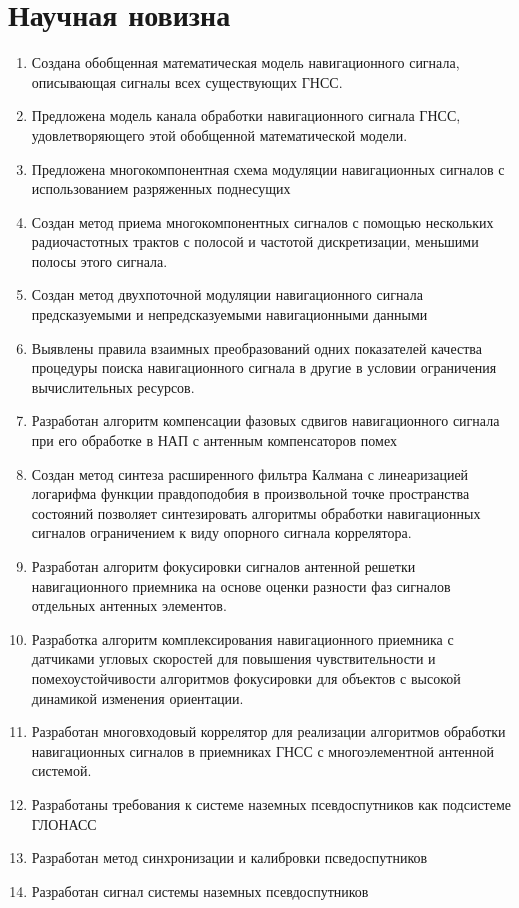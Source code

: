 \section*{Научная новизна}

\begin{enumerate}
\item Создана обобщенная математическая модель навигационного сигнала, описывающая сигналы всех существующих ГНСС.
\item Предложена модель канала обработки навигационного сигнала ГНСС, удовлетворяющего этой обобщенной математической модели.
\item Предложена многокомпонентная схема модуляции навигационных сигналов с использованием разряженных поднесущих
\item Создан метод приема многокомпонентных сигналов с помощью нескольких радиочастотных трактов с полосой и частотой дискретизации, меньшими полосы этого сигнала.
\item Создан метод двухпоточной модуляции навигационного сигнала предсказуемыми и непредсказуемыми навигационными данными
\item Выявлены правила взаимных преобразований одних показателей качества процедуры поиска навигационного сигнала в другие в условии ограничения вычислительных ресурсов.
\item Разработан алгоритм компенсации фазовых сдвигов навигационного сигнала при его обработке в НАП с антенным компенсаторов помех
\item Создан метод синтеза расширенного фильтра Калмана с линеаризацией логарифма функции правдоподобия в произвольной точке пространства состояний позволяет синтезировать алгоритмы обработки навигационных сигналов ограничением к виду опорного сигнала коррелятора.
\item Разработан алгоритм фокусировки сигналов антенной решетки навигационного приемника на основе оценки разности фаз сигналов отдельных антенных элементов.
\item Разработка алгоритм комплексирования навигационного приемника с датчиками угловых скоростей для повышения чувствительности и помехоустойчивости алгоритмов фокусировки для объектов с высокой динамикой изменения ориентации. 
\item Разработан многовходовый коррелятор для реализации алгоритмов обработки навигационных сигналов в приемниках ГНСС с многоэлементной антенной системой.
\item Разработаны требования к системе наземных псевдоспутников как подсистеме ГЛОНАСС
\item Разработан метод синхронизации и калибровки псведоспутников
\item Разработан сигнал системы наземных псевдоспутников
\end{enumerate}


